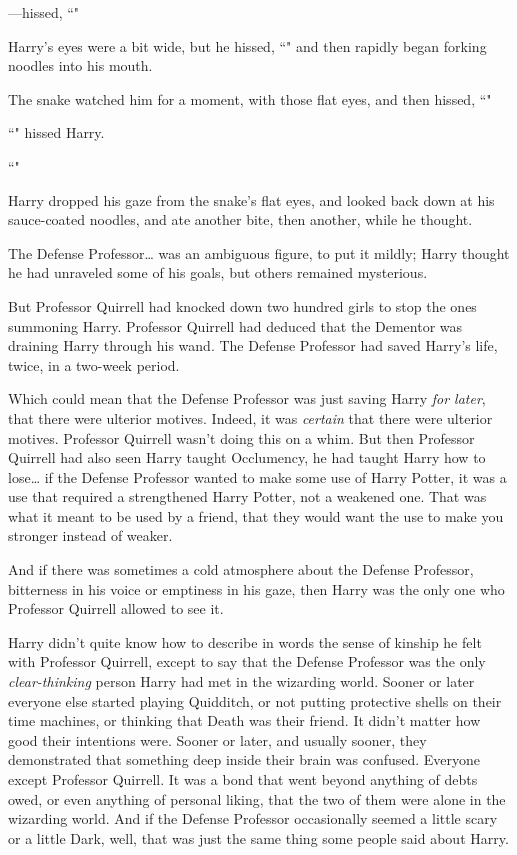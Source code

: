 —hissed, ``"

Harry's eyes were a bit wide, but he hissed, ``" and then rapidly began forking noodles into his mouth.

The snake watched him for a moment, with those flat eyes, and then hissed, ``"

``" hissed Harry.

``"

Harry dropped his gaze from the snake's flat eyes, and looked back down at his sauce-coated noodles, and ate another bite, then another, while he thought.

The Defense Professor{\ldots} was an ambiguous figure, to put it mildly; Harry thought he had unraveled some of his goals, but others remained mysterious.

But Professor Quirrell had knocked down two hundred girls to stop the ones summoning Harry. Professor Quirrell had deduced that the Dementor was draining Harry through his wand. The Defense Professor had saved Harry's life, twice, in a two-week period.

Which could mean that the Defense Professor was just saving Harry \emph{for later}, that there were ulterior motives. Indeed, it was \emph{certain} that there were ulterior motives. Professor Quirrell wasn't doing this on a whim. But then Professor Quirrell had also seen Harry taught Occlumency, he had taught Harry how to lose{\ldots} if the Defense Professor wanted to make some use of Harry Potter, it was a use that required a strengthened Harry Potter, not a weakened one. That was what it meant to be used by a friend, that they would want the use to make you stronger instead of weaker.

And if there was sometimes a cold atmosphere about the Defense Professor, bitterness in his voice or emptiness in his gaze, then Harry was the only one who Professor Quirrell allowed to see it.

Harry didn't quite know how to describe in words the sense of kinship he felt with Professor Quirrell, except to say that the Defense Professor was the only \emph{clear-thinking} person Harry had met in the wizarding world. Sooner or later everyone else started playing Quidditch, or not putting protective shells on their time machines, or thinking that Death was their friend. It didn't matter how good their intentions were. Sooner or later, and usually sooner, they demonstrated that something deep inside their brain was confused. Everyone except Professor Quirrell. It was a bond that went beyond anything of debts owed, or even anything of personal liking, that the two of them were alone in the wizarding world. And if the Defense Professor occasionally seemed a little scary or a little Dark, well, that was just the same thing some people said about Harry.

